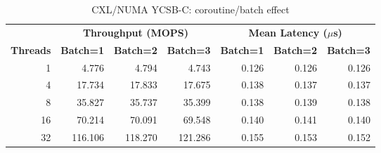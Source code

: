 \documentclass[conference]{IEEEtran}
\begin{document}
\begin{table}[H]
\centering
\caption{CXL/NUMA YCSB-C: coroutine/batch effect}
\label{tab:numa-coro}
\scriptsize
\begin{tabular}{@{}rrrr|rrr@{}}
\toprule
& \multicolumn{3}{c|}{\textbf{Throughput (MOPS)}} & \multicolumn{3}{c}{\textbf{Mean Latency ($\mu$s)}} \\
\textbf{Threads} & \textbf{Batch=1} & \textbf{Batch=2} & \textbf{Batch=3} & \textbf{Batch=1} & \textbf{Batch=2} & \textbf{Batch=3} \\
\midrule
1  & 4.776  & 4.794  & 4.743  & 0.126 & 0.126 & 0.126 \\
4  & 17.734 & 17.833 & 17.675 & 0.138 & 0.137 & 0.137 \\
8  & 35.827 & 35.737 & 35.399 & 0.138 & 0.139 & 0.138 \\
16 & 70.214 & 70.091 & 69.548 & 0.140 & 0.141 & 0.140 \\
32 & 116.106 & 118.270 & 121.286 & 0.155 & 0.153 & 0.152 \\
\bottomrule
\end{tabular}
\end{table}

\begin{table}[H]
\centering
\caption{CXL/NUMA results across YCSB workloads (coro=2, mem\_threads=1)}
\label{tab:numa-ycsb-all}
\scriptsize
{}
\end{table}
\end{document}

